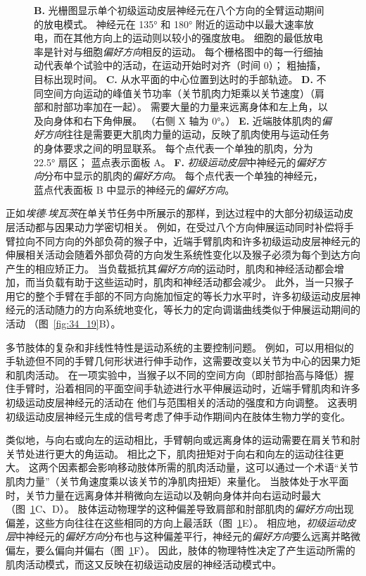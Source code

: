\begin{figure}[htbp]
{		\textbf{B.} 光栅图显示单个初级运动皮层神经元在八个方向的全臂运动期间的放电模式。
		神经元在 135° 和 180° 附近的运动中以最大速率放电，而在其他方向上的运动则以较小的强度放电。
		细胞的最低放电率是针对与细胞\textit{偏好方向}相反的运动。
		每个栅格图中的每一行细抽动代表单个试验中的活动，在运动开始时对齐（时间 0）；
		粗抽搐，目标出现时间\cite{georgopoulos1982relations}。
		\textbf{C.} 从水平面的中心位置到达时的手部轨迹。 \textbf{D.} 不同空间方向运动的峰值关节功率（关节肌肉力矩乘以关节速度）（肩部和肘部功率加在一起）。
		需要大量的力量来远离身体和左上角，以及向身体和右下角伸展。 （右侧 X 轴为 0°。）
		\textbf{E.} 近端肢体肌肉的\textit{偏好方向}往往是需要更大肌肉力量的运动，反映了肌肉使用与运动任务的身体要求之间的明显联系。
		每个点代表一个单独的肌肉，分为 22.5° 扇区； 蓝点表示面板 A。 
		\textbf{F.} \textit{初级运动皮层}中神经元的\textit{偏好方向}分布中显示的肌肉的\textit{偏好方向}。
		每个点代表一个单独的神经元，蓝点代表面板 B 中显示的神经元的\textit{偏好方向}\cite{scott2001dissociation}。}
	\label{fig:34_20}
\end{figure}


正如\textit{埃德$\cdot$埃瓦茨}在单关节任务中所展示的那样，到达过程中的大部分初级运动皮层活动都与因果动力学密切相关。
例如，在受过八个方向伸展运动同时补偿将手臂拉向不同方向的外部负荷的猴子中，近端手臂肌肉和许多初级运动皮层神经元的伸展相关活动会随着外部负荷的方向发生系统性变化以及猴子必须为每个到达方向产生的相应矫正力。
当负载抵抗其\textit{偏好方向}的运动时，肌肉和神经活动都会增加，而当负载有助于这些运动时，肌肉和神经活动都会减少。
此外，当一只猴子用它的整个手臂在手部的不同方向施加恒定的等长力水平时，许多初级运动皮层神经元的活动随力的方向系统地变化，等长力的定向调谐曲线类似于伸展运动期间的活动 （图~\ref{fig:34_19}B）。


多节肢体的复杂和非线性特性是运动系统的主要控制问题。
例如，可以用相似的手轨迹但不同的手臂几何形状进行伸手动作，这需要改变以关节为中心的因果力矩和肌肉活动。
在一项实验中，当猴子以不同的空间方向（即肘部抬高与降低）握住手臂时，沿着相同的平面空间手轨迹进行水平伸展运动时，近端手臂肌肉和许多初级运动皮层神经元的活动在 他们与范围相关的活动的强度和方向调整。
这表明初级运动皮层神经元生成的信号考虑了伸手动作期间内在肢体生物力学的变化。


类似地，与向右或向左的运动相比，手臂朝向或远离身体的运动需要在肩关节和肘关节处进行更大的角运动。
相比之下，肌肉扭矩对于向右和向左的运动往往更大。
这两个因素都会影响移动肢体所需的肌肉活动量，这可以通过一个术语“关节肌肉力量”（关节角速度乘以该关节的净肌肉扭矩）来量化。
当肢体处于水平面时，关节力量在远离身体并稍微向左运动以及朝向身体并向右运动时最大（图~\ref{fig:34_20}C、D）。
肢体运动物理学的这种偏差导致肩部和肘部肌肉的\textit{偏好方向}出现偏差，这些方向往往在这些相同的方向上最活跃（图~\ref{fig:34_20}E）。
相应地，\textit{初级运动皮层}中神经元的\textit{偏好方向}分布也与这种偏差平行，神经元的\textit{偏好方向}要么远离并略微偏左，要么偏向并偏右（图~\ref{fig:34_20}F）。
因此，肢体的物理特性决定了产生运动所需的肌肉活动模式，而这又反映在初级运动皮层的神经活动模式中。


